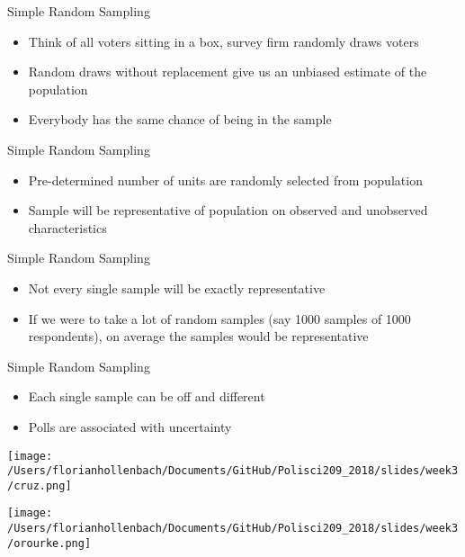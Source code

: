 \documentclass[presentation]{beamer}
\begin{document}
\begin{frame}[label={sec:org27b2827}]{Simple Random Sampling}
\begin{itemize}
\item Think of all voters sitting in a box, survey firm randomly draws voters

\item Random draws without replacement give us an unbiased estimate of the population

\item Everybody has the same chance of being in the sample
\end{itemize}
\end{frame}


\begin{frame}[label={sec:org1ede10f}]{Simple Random Sampling}
\begin{itemize}
\item Pre-determined number of units are randomly selected from population

\item Sample will be representative of population on observed and unobserved characteristics
\end{itemize}
\end{frame}



\begin{frame}[label={sec:orgf9ede7f}]{Simple Random Sampling}
\begin{itemize}
\item Not every single sample will be exactly representative

\item If we were to take a lot of random samples (say 1000 samples of 1000 respondents), on average the samples would be representative
\end{itemize}
\end{frame}

\begin{frame}[label={sec:org555ea27}]{Simple Random Sampling}
\begin{itemize}
\item Each single sample can be off and different

\item Polls are associated with uncertainty
\end{itemize}

\begin{center}
\texttt{[image: /Users/florianhollenbach/Documents/GitHub/Polisci209\_2018/slides/week3/cruz.png]}
\end{center}

\pause


\begin{center}
\texttt{[image: /Users/florianhollenbach/Documents/GitHub/Polisci209\_2018/slides/week3/orourke.png]}
\end{center}
\end{frame}
\end{document}
